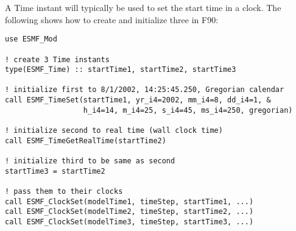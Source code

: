 
A Time instant will typically be used to set the start time in a
clock.  The following shows how to create and initialize three in F90:

\begin{verbatim}
use ESMF_Mod

! create 3 Time instants
type(ESMF_Time) :: startTime1, startTime2, startTime3

! initialize first to 8/1/2002, 14:25:45.250, Gregorian calendar
call ESMF_TimeSet(startTime1, yr_i4=2002, mm_i4=8, dd_i4=1, &
                  h_i4=14, m_i4=25, s_i4=45, ms_i4=250, gregorian)

! initialize second to real time (wall clock time)
call ESMF_TimeGetRealTime(startTime2)

! initialize third to be same as second
startTime3 = startTime2

! pass them to their clocks
call ESMF_ClockSet(modelTime1, timeStep, startTime1, ...)
call ESMF_ClockSet(modelTime2, timeStep, startTime2, ...)
call ESMF_ClockSet(modelTime3, timeStep, startTime3, ...)
\end{verbatim}
